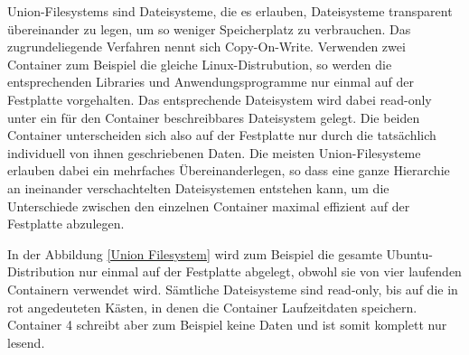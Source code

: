 Union-Filesystems sind Dateisysteme, die es erlauben, Dateisysteme transparent übereinander zu legen, um so weniger Speicherplatz zu verbrauchen. Das zugrundeliegende Verfahren nennt sich Copy-On-Write. Verwenden zwei Container zum Beispiel die gleiche Linux-Distrubution, so werden die entsprechenden Libraries und Anwendungsprogramme nur einmal auf der Festplatte vorgehalten. Das entsprechende Dateisystem wird dabei read-only unter ein für den Container beschreibbares Dateisystem gelegt. Die beiden Container unterscheiden sich also auf der Festplatte nur durch die tatsächlich individuell von ihnen geschriebenen Daten. Die meisten Union-Filesysteme erlauben dabei ein mehrfaches Übereinanderlegen, so dass eine ganze Hierarchie an ineinander verschachtelten Dateisystemen entstehen kann, um die Unterschiede zwischen den einzelnen Container maximal effizient auf der Festplatte abzulegen.

In der Abbildung \ref{Union Filesystem} wird zum Beispiel die gesamte Ubuntu-Distribution nur einmal auf der Festplatte abgelegt, obwohl sie von vier laufenden Containern verwendet wird. Sämtliche Dateisysteme sind read-only, bis auf die in rot angedeuteten Kästen, in denen die Container Laufzeitdaten speichern. Container 4 schreibt aber zum Beispiel keine Daten und ist somit komplett nur lesend.
